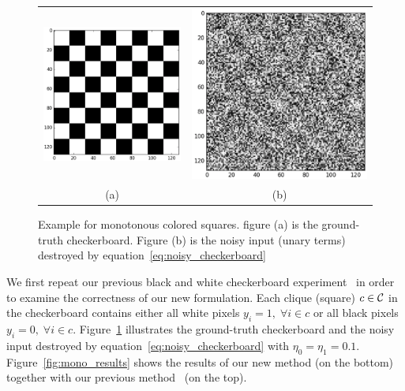 \begin{figure}[hb]
  \centering
  \setlength{\tabcolsep}{2pt}
  \begin{tabular}{cc}
    \includegraphics[width=0.5\columnwidth]{Experiments/figures/mono_gt.png}&
                                                                            \includegraphics[width=0.5\columnwidth]{Experiments/figures/mono_noisy.png}\\
    {\small (a)} & {\small (b)} 
  \end{tabular}
  \caption{\label{fig:mono_checkerboard} Example for monotonous
    colored squares. figure (a) is the ground-truth checkerboard.
    Figure (b) is the noisy input (unary terms) destroyed by
    equation~\eqref{eq:noisy_checkerboard}}
\end{figure}

We first repeat our previous black and white checkerboard
experiment~\cite{Gould:ICML2011,gouldlearning} in order to
examine the correctness of our new formulation. Each clique
(square) $c\in {\cal C}$ in the checkerboard contains either all white
pixels $y_i=1 ,\;\forall i \in c$ or all black pixels $y_i=0
,\;\forall i \in c$. Figure~\ref{fig:mono_checkerboard}
illustrates the ground-truth checkerboard and the noisy input
destroyed by equation~\eqref{eq:noisy_checkerboard} with
$\eta_0=\eta_1=0.1$. Figure~\ref{fig:mono_results} shows the
results of our new method (on the bottom) together with our
previous method~\cite{gouldlearning} (on the top).

